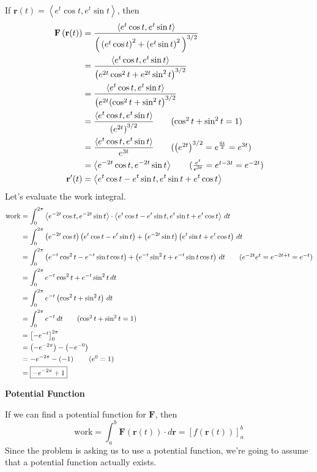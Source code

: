 \documentclass{article}
\newcommand{\lrp}[1]{\left( #1 \right)}
\newcommand{\lra}[1]{\left\langle #1 \right\rangle}
\newcommand{\lrb}[1]{\left[ #1 \right]}
\renewcommand{\r}[0]{\mathbf{r}}
\newcommand{\F}[0]{\mathbf{F}}
\begin{document}
If $\r(t)=\lra{e^t\cos t,e^t\sin t}$, then
\begin{align*}
    \F\lrp{\r(t)}&=\frac{\lra{e^t\cos t,e^t\sin t}}{\Big(\lrp{e^t\cos t}^2+\lrp{e^t\sin t}^2\Big)^{3/2}}\\
    &=\frac{\lra{e^t\cos t,e^t\sin t}}{\lrp{e^{2t}\cos^2t + e^{2t}\sin ^2 t}^{3/2}}\\
    &=\frac{\lra{e^t\cos t,e^t\sin t}}{\lrp{e^{2t}(\cos^2t +\sin^2t}^{3/2}}\\
    &=\frac{\lra{e^t\cos t,e^t\sin t}}{\lrp{e^{2t}}^{3/2}}\tag{$\cos^2 t+\sin^2 t=1$}\\
    &=\frac{\lra{e^t\cos t,e^t\sin t}}{e^{3t}}\tag{$\lrp{e^{2t}}^{3/2}=e^{\frac{6t}{2}}=e^{3t}$}\\
    &=\lra{e^{-2t}\cos t, e^{-2t}\sin t}\tag{$\frac{e^t}{e^{3t}}=e^{t-3t}=e^{-2t}$}\\
    \r'(t)&=\lra{e^t\cos t - e^t\sin t, e^t\sin t + e^t \cos t}
\end{align*}
Let's evaluate the work integral.
\begin{align*}
    \text{work}&=\int_0^{2\pi}\lra{e^{-2t}\cos t, e^{-2t}\sin t}\cdot\lra{e^t\cos t - e^t\sin t, e^t\sin t + e^t \cos t}\,dt\\
    &=\int_0^{2\pi}\lrp{e^{-2t}\cos t}\lrp{e^t\cos t-e^t\sin t}+\lrp{e^{-2t}\sin t}\lrp{e^t\sin t+e^t\cos t}\,dt\\
    &=\int_0^{2\pi} \lrp{e^{-t}\cos^2 t-e^{-t}\sin t\cos t}+\lrp{e^{-t}\sin^2 t+e^{-t}\sin t\cos t}\, dt\tag{$e^{-2t}e^t=e^{-2t+t}=e^{-t}$}\\
    &=\int_0^{2\pi} e^{-t}\cos^2 t + e^{-t}\sin ^2 t\,dt\\
    &=\int_0^{2\pi} e^{-t}\lrp{\cos ^2 t+\sin ^2 t}\,dt\\
    &=\int_0^{2\pi} e^{-t}\,dt\tag{$\cos ^2 t + \sin ^2 t =1$}\\
    &=\lrb{-e^{-t}}_0^{2\pi}\\
    &=\lrp{-e^{-2\pi}}-\lrp{-e^{-0}}\\
    &=-e^{-2\pi}-\lrp{-1}\tag{$e^0=1$}\\
    &=\boxed{-e^{-2\pi}+1}
\end{align*}

{} \textbf{Potential Function}

If we can find a potential function for $\F$, then
\begin{equation*}
    \text{work}=\int_a^b \F\lrp{\r(t)}\cdot d\r=\lrb{f\lrp{\r(t)}}_a^b
\end{equation*}
Since the problem is asking us to use a potential function, we're going to assume that a potential function actually exists.
\end{document}
